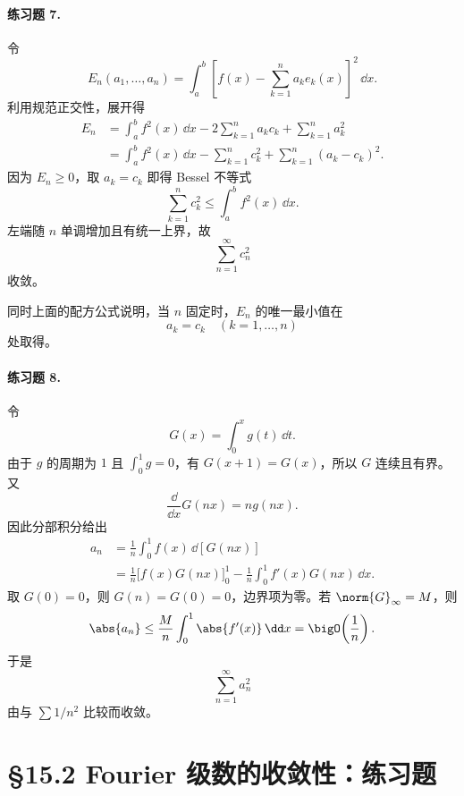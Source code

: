 \paragraph{练习题 7.}
\begin{xsolution}
令
\[
  E_n(a_1,\ldots,a_n)
  =\int_a^b\left[f(x)-\sum_{k=1}^{n}a_ke_k(x)\right]^2\,\dd x.
\]
利用规范正交性，展开得
\begin{align*}
  E_n
  &=\int_a^bf^2(x)\,\dd x
    -2\sum_{k=1}^{n}a_kc_k+\sum_{k=1}^{n}a_k^2\\
  &=\int_a^bf^2(x)\,\dd x-\sum_{k=1}^{n}c_k^2
    +\sum_{k=1}^{n}(a_k-c_k)^2.
\end{align*}
因为 $E_n\ge0$，取 $a_k=c_k$ 即得 Bessel 不等式
\[
  \sum_{k=1}^{n}c_k^2\le\int_a^bf^2(x)\,\dd x.
\]
左端随 $n$ 单调增加且有统一上界，故
\[
  \sum_{n=1}^{\infty}c_n^2
\]
收敛。

同时上面的配方公式说明，当 $n$ 固定时，$E_n$ 的唯一最小值在
\[
  \boxed{a_k=c_k\quad(k=1,\ldots,n)}
\]
处取得。
\end{xsolution}

\paragraph{练习题 8.}
\begin{xsolution}
令
\[
  G(x)=\int_0^xg(t)\,\dd t.
\]
由于 $g$ 的周期为 $1$ 且 $\int_0^1g=0$，有 $G(x+1)=G(x)$，所以 $G$ 连续且有界。又
\[
  \frac{\dd}{\dd x}G(nx)=n g(nx).
\]
因此分部积分给出
\begin{align*}
  a_n
  &=\frac1n\int_0^1f(x)\,\dd[G(nx)]\\
  &=\frac1n\bigl[f(x)G(nx)\bigr]_0^1
    -\frac1n\int_0^1f'(x)G(nx)\,\dd x.
\end{align*}
取 $G(0)=0$，则 $G(n)=G(0)=0$，边界项为零。若
$\norm{G}_\infty=M$，则
\[
  \abs{a_n}\le\frac{M}{n}\int_0^1\abs{f'(x)}\,\dd x=\bigO\!\left(\frac1n\right).
\]
于是
\[
  \sum_{n=1}^{\infty}a_n^2
\]
由与 $\sum1/n^2$ 比较而收敛。
\end{xsolution}

\section*{§15.2 Fourier 级数的收敛性：练习题}

